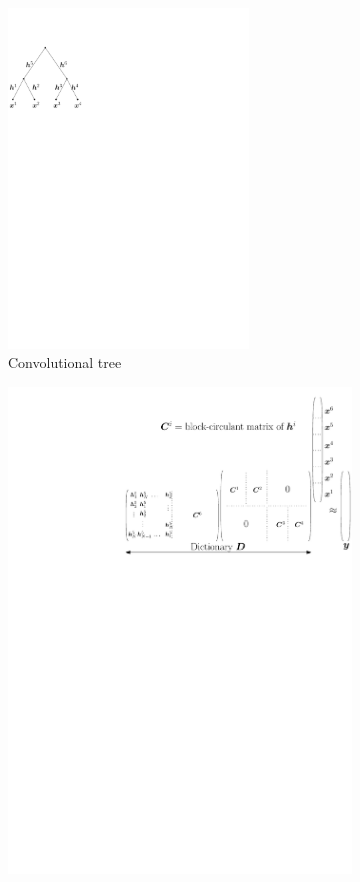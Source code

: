 \begin{figure}[!ht] \centering
\begin{subfigure}[b]{0.30\textwidth}\centering
\includegraphics[width=0.7\textwidth]{figures/pov-tree.pdf}
\caption{Convolutional tree}
\end{subfigure}
\begin{subfigure}[b]{0.69\textwidth}\centering
\includegraphics[width=\textwidth]{figures/pov-matrix.pdf}

\end{subfigure}
\end{figure}
